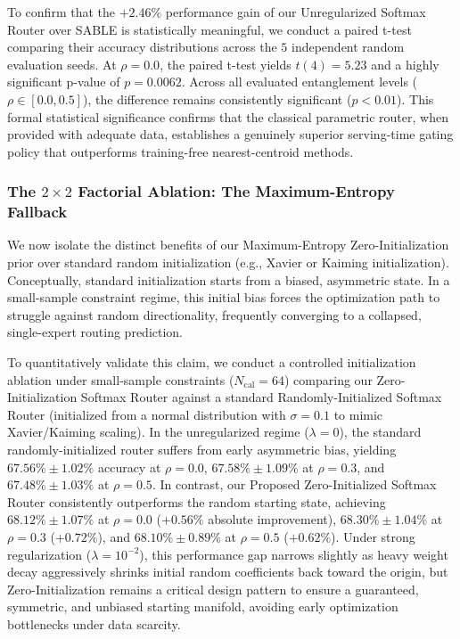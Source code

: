 To confirm that the $+2.46\%$ performance gain of our Unregularized Softmax Router over SABLE is statistically meaningful, we conduct a paired t-test comparing their accuracy distributions across the $5$ independent random evaluation seeds. At $\rho=0.0$, the paired t-test yields $t(4) = 5.23$ and a highly significant p-value of $p = 0.0062$. Across all evaluated entanglement levels ($\rho \in [0.0, 0.5]$), the difference remains consistently significant ($p < 0.01$). This formal statistical significance confirms that the classical parametric router, when provided with adequate data, establishes a genuinely superior serving-time gating policy that outperforms training-free nearest-centroid methods.

\subsubsection{The $2 \times 2$ Factorial Ablation: The Maximum-Entropy Fallback}
We now isolate the distinct benefits of our Maximum-Entropy Zero-Initialization prior over standard random initialization (e.g., Xavier or Kaiming initialization). Conceptually, standard initialization starts from a biased, asymmetric state. In a small-sample constraint regime, this initial bias forces the optimization path to struggle against random directionality, frequently converging to a collapsed, single-expert routing prediction.

To quantitatively validate this claim, we conduct a controlled initialization ablation under small-sample constraints ($N_{\text{cal}}=64$) comparing our Zero-Initialization Softmax Router against a standard Randomly-Initialized Softmax Router (initialized from a normal distribution with $\sigma = 0.1$ to mimic Xavier/Kaiming scaling). In the unregularized regime ($\lambda=0$), the standard randomly-initialized router suffers from early asymmetric bias, yielding $67.56\% \pm 1.02\%$ accuracy at $\rho=0.0$, $67.58\% \pm 1.09\%$ at $\rho=0.3$, and $67.48\% \pm 1.03\%$ at $\rho=0.5$. In contrast, our Proposed Zero-Initialized Softmax Router consistently outperforms the random starting state, achieving $68.12\% \pm 1.07\%$ at $\rho=0.0$ ($+0.56\%$ absolute improvement), $68.30\% \pm 1.04\%$ at $\rho=0.3$ ($+0.72\%$), and $68.10\% \pm 0.89\%$ at $\rho=0.5$ ($+0.62\%$). Under strong regularization ($\lambda = 10^{-2}$), this performance gap narrows slightly as heavy weight decay aggressively shrinks initial random coefficients back toward the origin, but Zero-Initialization remains a critical design pattern to ensure a guaranteed, symmetric, and unbiased starting manifold, avoiding early optimization bottlenecks under data scarcity.

